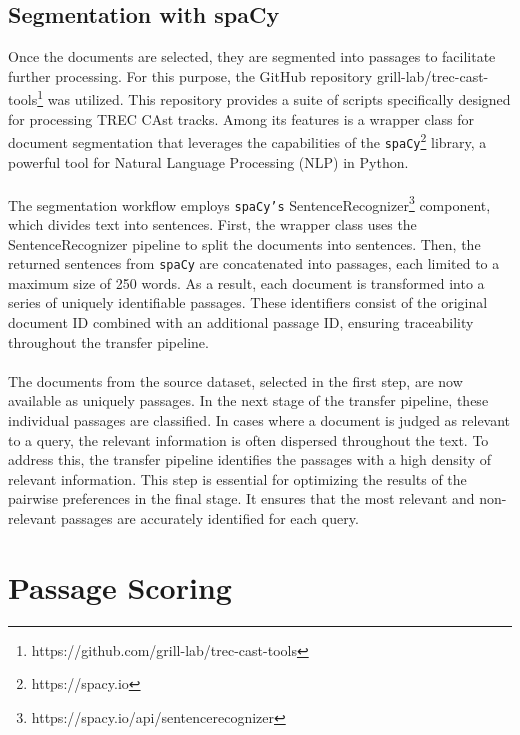 \subsection{Segmentation with spaCy}\label{segmentation-with-spacy}

Once the documents are selected, they are segmented into passages to facilitate further processing. For this purpose, the GitHub repository grill-lab/trec-cast-tools\footnote{https://github.com/grill-lab/trec-cast-tools} was utilized. This repository provides a suite of scripts specifically designed for processing TREC CAst tracks. Among its features is a wrapper class for document segmentation that leverages the capabilities of the \texttt{spaCy}\footnote{https://spacy.io} library, a powerful tool for Natural Language Processing (NLP) in Python.
\\\\
The segmentation workflow employs \texttt{spaCy's} SentenceRecognizer\footnote{https://spacy.io/api/sentencerecognizer} component, which divides text into sentences. First, the wrapper class uses the SentenceRecognizer pipeline to split the documents into sentences. Then, the returned sentences from \texttt{spaCy} are concatenated into passages, each limited to a maximum size of 250 words. As a result, each document is transformed into a series of uniquely identifiable passages. These identifiers consist of the original document ID combined with an additional passage ID, ensuring traceability throughout the transfer pipeline.
\\\\
The documents from the source dataset, selected in the first step, are now available as uniquely passages. In the next stage of the transfer pipeline, these individual passages are classified. In cases where a document is judged as relevant to a query, the relevant information is often dispersed throughout the text. To address this, the transfer pipeline identifies the passages with a high density of relevant information. This step is essential for optimizing the results of the pairwise preferences in the final stage. It ensures that the most relevant and non-relevant passages are accurately identified for each query.


\section{Passage Scoring}\label{passage-scoring}

